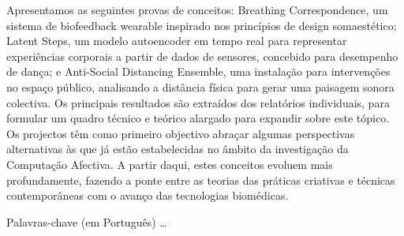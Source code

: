 Apresentamos as seguintes provas de conceitos: Breathing Correspondence, um sistema de biofeedback wearable inspirado nos princípios de design somaestético; Latent Steps, um modelo autoencoder em tempo real para representar experiências corporais a partir de dados de sensores, concebido para desempenho de dança; e Anti-Social Distancing Ensemble, uma instalação para intervenções no espaço público, analisando a distância física para gerar uma paisagem sonora colectiva. Os principais resultados são extraídos dos relatórios individuais, para formular um quadro técnico e teórico alargado para expandir sobre este tópico. Os projectos têm como primeiro objectivo abraçar algumas perspectivas alternativas às que já estão estabelecidas no âmbito da investigação da Computação Afectiva. A partir daqui, estes conceitos evoluem mais profundamente, fazendo a ponte entre as teorias das práticas criativas e técnicas contemporâneas com o avanço das tecnologias biomédicas.


\begin{keywords}
Palavras-chave (em Português) \ldots
\end{keywords}
